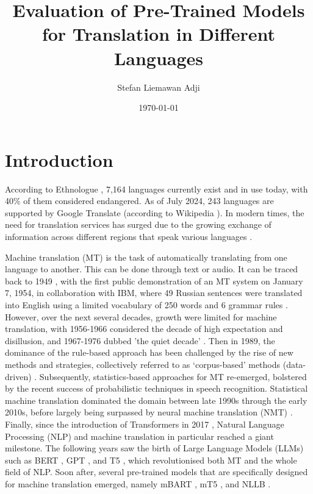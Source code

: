 \documentclass[a4paper]{article}
\title{Evaluation of Pre-Trained Models for Translation in Different Languages}
\author{Stefan Liemawan Adji}
\date{\today}
\begin{document}
\maketitle

\section{Introduction}

According to Ethnologue \cite{ethnologue-2024}, 7,164 languages currently exist and in use today, with 40\% of them considered endangered. As of July 2024, 243 languages are supported by Google Translate (according to Wikipedia \cite{wikipedia-google-translate}). In modern times, the need for translation services has surged due to the growing exchange of information across different regions that speak various languages \cite{okpor-2014-machine-ta}.

Machine translation (MT) is the task of automatically translating from one language to another. This can be done through text or audio. It can be traced back to 1949 \cite{weaver-1999}, with the first public demonstration of an MT system on January 7, 1954, in collaboration with IBM, where 49 Russian sentences were translated into English using a limited vocabulary of 250 words and 6 grammar rules \cite{hutchins-2006-first-mt}. However, over the next several decades, growth were limited for machine translation, with 1956-1966 considered the decade of high expectation and disillusion, and 1967-1976 dubbed 'the quiet decade' \cite{hutchins-2001-mt-50-years}. Then in 1989, the dominance of the rule-based approach has been challenged by the rise of new methods and strategies, collectively referred to as ‘corpus-based’ methods (data-driven) \cite{hutchins-1994-research-methods-mt,hutchins-1998-development-mt}. Subsequently, statistics-based approaches for MT re-emerged, bolstered by the recent success of probabilistic techniques in speech recognition. Statistical machine translation \cite{lopez-2008-smt} dominated the domain between late 1990s through the early 2010s, before largely being surpassed by neural machine translation (NMT) \cite{cho-2014-properties,sutskever-2014-seq2seq}. Finally, since the introduction of Transformers in 2017 \cite{vaswani-2017-attention}, Natural Language Processing (NLP) and machine translation in particular reached a giant milestone. The following years saw the birth of Large Language Models (LLMs) such as BERT \cite{devlin-2019-bert}, GPT \cite{openai-2024-gpt4}, and T5 \cite{raffel-2023-t5}, which revolutionised both MT and the whole field of NLP. Soon after, several pre-trained models that are specifically designed for machine translation emerged, namely mBART \cite{liu-2020-mbart}, mT5 \cite{xue-2021-mt5}, and NLLB \cite{nllb200}.
\end{document}
